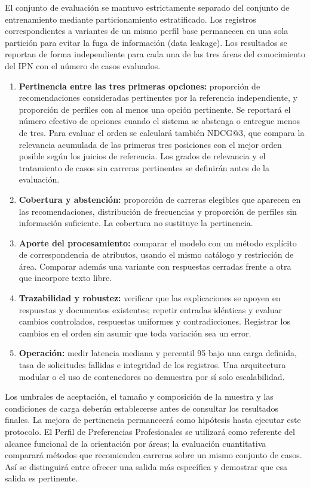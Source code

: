 El conjunto de evaluación se mantuvo estrictamente separado del conjunto de entrenamiento mediante particionamiento estratificado. Los registros correspondientes a variantes de un mismo perfil base permanecen en una sola partición para evitar la fuga de información (data leakage). Los resultados se reportan de forma independiente para cada una de las tres áreas del conocimiento del IPN con el número de casos evaluados.

\begin{enumerate}
\item \textbf{Pertinencia entre las tres primeras opciones:} proporción de recomendaciones consideradas pertinentes por la referencia independiente, y proporción de perfiles con al menos una opción pertinente. Se reportará el número efectivo de opciones cuando el sistema se abstenga o entregue menos de tres. Para evaluar el orden se calculará también NDCG@3, que compara la relevancia acumulada de las primeras tres posiciones con el mejor orden posible según los juicios de referencia. Los grados de relevancia y el tratamiento de casos sin carreras pertinentes se definirán antes de la evaluación.
\item \textbf{Cobertura y abstención:} proporción de carreras elegibles que aparecen en las recomendaciones, distribución de frecuencias y proporción de perfiles sin información suficiente. La cobertura no sustituye la pertinencia.
\item \textbf{Aporte del procesamiento:} comparar el modelo con un método explícito de correspondencia de atributos, usando el mismo catálogo y restricción de área. Comparar además una variante con respuestas cerradas frente a otra que incorpore texto libre.
\item \textbf{Trazabilidad y robustez:} verificar que las explicaciones se apoyen en respuestas y documentos existentes; repetir entradas idénticas y evaluar cambios controlados, respuestas uniformes y contradicciones. Registrar los cambios en el orden sin asumir que toda variación sea un error.
\item \textbf{Operación:} medir latencia mediana y percentil 95 bajo una carga definida, tasa de solicitudes fallidas e integridad de los registros. Una arquitectura modular o el uso de contenedores no demuestra por sí solo escalabilidad.
\end{enumerate}

Los umbrales de aceptación, el tamaño y composición de la muestra y las condiciones de carga deberán establecerse antes de consultar los resultados finales. La mejora de pertinencia permanecerá como hipótesis hasta ejecutar este protocolo. El Perfil de Preferencias Profesionales se utilizará como referente del alcance funcional de la orientación por áreas; la evaluación cuantitativa comparará métodos que recomienden carreras sobre un mismo conjunto de casos. Así se distinguirá entre ofrecer una salida más específica y demostrar que esa salida es pertinente.
